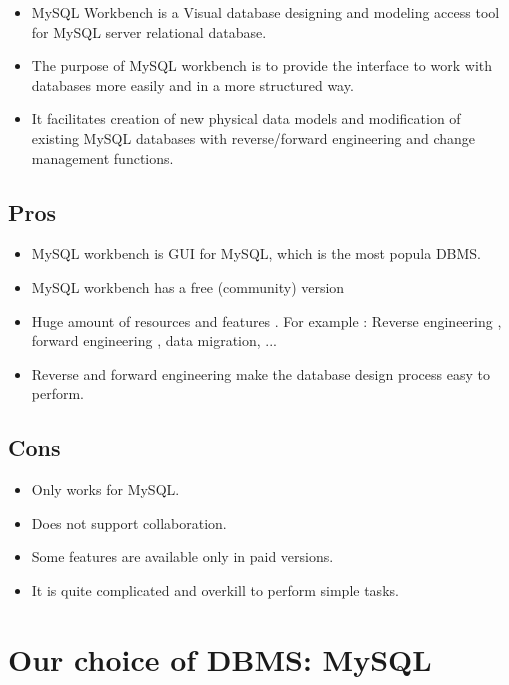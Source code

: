 \documentclass[a4paper]{article}
\numberwithin{equation}{section}
\begin{document}
\begin{itemize}
    \item MySQL Workbench is a Visual database designing and modeling access tool for MySQL server relational database.
    \item The purpose of MySQL workbench is to provide the interface to work with databases more easily and in a more structured way.
    \item It facilitates creation of new physical data models and modification of existing MySQL databases with reverse/forward engineering and change management functions. 
\end{itemize}

\subsection{Pros}
\begin{itemize}
    \item MySQL workbench is GUI for MySQL, which is the most popula DBMS.
\item MySQL workbench has a free (community) version
\item Huge amount of resources and features . For example : Reverse engineering , forward engineering , data migration, ...
\item Reverse and forward engineering make the database design process easy to perform. %
\end{itemize}

\subsection{Cons}
\begin{itemize}
    \item Only works for MySQL.
\item Does not support collaboration.
\item Some features are available only in paid versions.
\item It is quite complicated and overkill to perform simple tasks.
\end{itemize}

\newpage


\section{Our choice of DBMS: MySQL }
\end{document}

